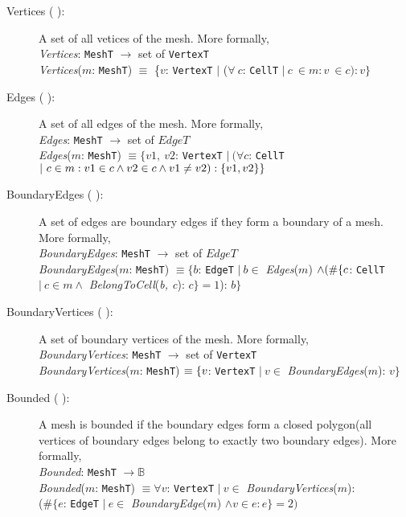 \documentclass[12pt,titlepage]{article}
\begin{document}
\begin{description}
\item [Vertices ( \dtheddnum \label{dVertices}):] A set of all vetices of the mesh. More formally,\\
{\it Vertices}: {\tt MeshT} $\rightarrow$ set of {\tt VertexT}\\
{\it Vertices}($m$: {\tt MeshT}) $\equiv$ \{$v$: {\tt VertexT} $|$ ($\forall\ c$: {\tt CellT} $|\ c\ \in m :v\ \in c):v\}$

\item [Edges ( \dtheddnum \label{dEdges}):] A set of all edges of the mesh. More formally, \\
{\it Edges}: {\tt MeshT} $\rightarrow $ set of $EdgeT$\\
{\it Edges}($m$: {\tt MeshT}) $\equiv \{v1,\ v2$: {\tt VertexT} $|\ (\forall c$: {\tt CellT} $|\ c \in m:\\ v1 \in c \wedge v2 \in c \wedge v1 \neq v2):\{v1, v2\}\}$
 
\item [BoundaryEdges ( \dtheddnum \label{dBoundaryEdges}):]A set of edges are boundary edges if they form a boundary of a mesh. More formally,\\
{\it BoundaryEdges}: {\tt MeshT} $\rightarrow $ set of $EdgeT$\\
{\it BoundaryEdges}($m$: {\tt MeshT}) $\equiv \{ b$: {\tt EdgeT} $|\ b\in$ {\it Edges}($m$) $\wedge \\
(\# \{c$: {\tt CellT} $|\ c\in m \wedge$ {\it BelongToCell}({\it b, c}): $c\}=1$): $b\}$

\item [BoundaryVertices ( \dtheddnum \label{dBoundaryVertices}):] A set of boundary vertices of the mesh. More formally,\\
{\it BoundaryVertices}: {\tt MeshT} $\rightarrow$ set of {\tt VertexT}\\
{\it BoundaryVertices}($m$: {\tt MeshT}) $\equiv \\
\{v$: {\tt VertexT} $|\ v \in$ {\it BoundaryEdges}($m$): $v\}$

\item [Bounded ( \dtheddnum \label{dBounded}):] A mesh is bounded if the boundary edges form a closed polygon(all vertices of boundary edges belong to exactly two boundary edges). More formally, \\
{\it Bounded}: {\tt MeshT} $\rightarrow \mathbb{B}$\\
{\it Bounded}($m$: {\tt MeshT}) $\equiv \forall v$: {\tt VertexT} $|\ v\in$ {\it BoundaryVertices}($m$): \\
($\# \{e$: {\tt EdgeT} $|\ e \in$ {\it BoundaryEdge}($m$) $\wedge v\in e: e\}=2)$


\end{description}
\end{document}
